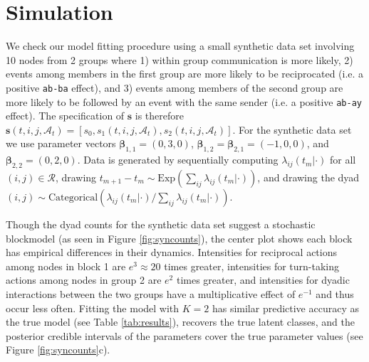 \section{Simulation}
\label{sec:simulation}

We check our model fitting procedure using a small synthetic data set involving 10 nodes from 2 groups where 1) within group communication is more likely, 2) events among members in the first group are more likely to be reciprocated  (i.e. a positive \texttt{ab-ba} effect), and 3) events among members of the second group are more likely to be followed by an event with the same sender (i.e. a positive \texttt{ab-ay} effect).  The specification of $\textbf{s}$ is therefore $\textbf{s}(t,i,j,\mathcal{A}_t) = [s_0, s_{1}(t,i,j,\mathcal{A}_t), s_{2}(t,i,j,\mathcal{A}_t)]$.  For the synthetic data set we use parameter vectors $\boldsymbol{\beta}_{1,1} = (0,3,0)$,  $\boldsymbol{\beta}_{1,2} = \boldsymbol{\beta}_{2,1} = (-1,0,0)$, and $\boldsymbol{\beta}_{2,2} = (0,2,0)$.
Data is generated by sequentially computing $\lambda_{ij}(t_m|\cdot)$ for all $(i,j) \in \mathcal{R}$, drawing $t_{m+1}-t_m \sim \mbox{Exp}(\sum_{ij} \lambda_{ij}(t_m|\cdot))$, and drawing the dyad $(i,j) \sim \mbox{Categorical}(\lambda_{ij}(t_m|\cdot) / \sum_{ij}\lambda_{ij}(t_m|\cdot))$.

Though the dyad counts for the synthetic data set suggest a stochastic blockmodel (as seen in Figure  \ref{fig:syncounts}),  the center plot shows each block has empirical differences in their dynamics.
Intensities for reciprocal actions among nodes in block 1 are $e^3 \approx 20$ times greater, intensities for turn-taking actions among nodes in group 2 are $e^2$ times greater, and intensities for dyadic interactions between the two groups have a multiplicative effect of $e^{-1}$ and thus occur less often.
Fitting the model with $K=2$ has similar  predictive accuracy as the true model (see Table \ref{tab:results}), recovers the true latent classes, and the posterior credible intervals of the parameters cover the true parameter values (see Figure \ref{fig:syncounts}c).
